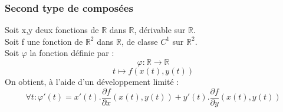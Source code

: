 \subsubsection{Second type de composées}
Soit x,y deux fonctions de $\mathbb{R}$ dans $\mathbb{R}$, dérivable sur $\mathbb{R}$.\\
Soit f une fonction de $\mathbb{R}^2$ dans $\mathbb{R}$, de classe $C^1$ sur $\mathbb{R}^2$.\\
Soit $\varphi$ la fonction définie par : 
$$\varphi : \mathbb{R} \rightarrow \mathbb{R}$$
$$t \mapsto f(x(t),y(t))$$
On obtient, à l'aide d'un développement limité :
$$\forall t : \varphi'(t) = x'(t).\dfrac{\partial f}{\partial x}(x(t),y(t)) + y'(t).\dfrac{\partial f}{\partial y}(x(t),y(t))$$
